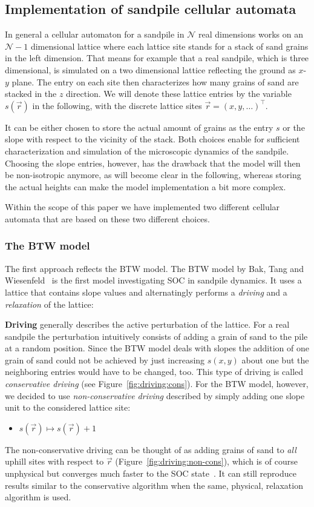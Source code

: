 \subsection{Implementation of sandpile cellular automata}
\label{sec:sandpileImplementation}
In general a cellular automaton for a sandpile in $\mathcal{N}$ real dimensions works on an $\mathcal{N}-1$ dimensional
lattice where each lattice site stands for a stack of sand grains in the left dimension. That means for example that
a real sandpile, which is three dimensional, is simulated on a two dimensional lattice reflecting the ground as $x$-$y$
plane. The entry on each site then characterizes how many grains of sand are stacked in the $z$ direction.
We will denote these lattice entries by the variable $s(\vec{r})$ in the following, with the discrete lattice sites
$\vec{r}=(x,y,\ldots)^\top$.

It can be either chosen to store the actual amount of grains as the entry $s$ or the slope with respect to the
vicinity of the stack. Both choices enable for sufficient characterization and simulation of the microscopic
dynamics of the sandpile. Choosing the slope entries, however, has the drawback that the model will then be
non-isotropic anymore, as will become clear in the following, whereas storing the actual heights can make the model
implementation a bit more complex.

Within the scope of this paper we have implemented two different cellular automata that are based on these two different
choices.

\subsubsection{The BTW model}
The first approach reflects the BTW model. The BTW model by Bak, Tang and Wiesenfeld~\cite{BakTangWiesenfeld:1987}
is the first model investigating SOC in sandpile dynamics. It uses a lattice that contains slope values and
alternatingly performs a \emph{driving} and a \emph{relaxation} of the lattice:

\textbf{Driving} generally describes the active perturbation of the lattice. For a real sandpile the perturbation
intuitively consists of adding a grain of sand to the pile at a random position. Since the BTW model deals with
slopes the addition of one grain of sand could not be achieved by just increasing $s(x,y)$ about one but the neighboring
entries would have to be changed, too. This type of driving is called \emph{conservative driving}
(see Figure~\ref{fig:driving:cons}).
For the BTW model, however, we decided to use \emph{non-conservative driving} described by simply adding one slope
unit to the considered lattice site:
\begin{itemize}
\item $s(\vec{r}) \mapsto s(\vec{r})+1$
\end{itemize}
The non-conservative driving can be thought of as adding grains of sand to \emph{all} uphill sites with respect to
$\vec{r}$ (Figure~\ref{fig:driving:non-cons}), which is of course unphysical but converges much faster to the
SOC state~\cite{Christensen1991}. It can still reproduce results similar to the conservative algorithm when the same,
physical, relaxation algorithm is used.


